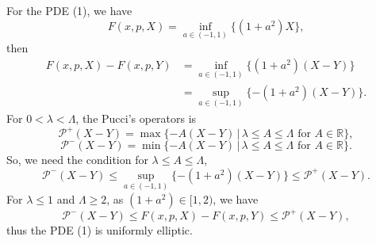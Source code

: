 \documentclass[12pt,a4paper]{ctexart}
\begin{document}
For the PDE (1), we have
\begin{equation*}
    F(x, p, X) = \inf_{a \in (-1, 1)} \{(1+a^2) X\}, 
\end{equation*}
then
\begin{align*}
    F(x, p, X) - F(x, p, Y) & = \inf_{a \in (-1, 1)} \{ (1 + a^2) (X - Y) \} \\
    & = \sup_{a \in (-1, 1)} \{-(1 + a^2) (X - Y)\}.
\end{align*}
For $0 < \lambda < \Lambda$, the Pucci's operators is 
\begin{equation*}
    \mathcal{P}^{+}(X - Y) = \max \{- A(X- Y) \,| \, \lambda \leq A \leq \Lambda \,\, \text{for} \,\, A \in \mathbb{R}\},
\end{equation*}
\begin{equation*}
    \mathcal{P}^{-}(X - Y) = \min \{- A(X - Y) \,| \, \lambda \leq A \leq \Lambda \,\, \text{for} \,\, A \in \mathbb{R}\}.
\end{equation*}
So, we need the condition for $\lambda \leq A \leq \Lambda$,
\begin{equation*}
    \mathcal{P}^{-}(X - Y) \leq \sup_{a \in (-1,1)} \{-(1 + a^2)(X - Y)\} \leq \mathcal{P}^{+}(X - Y).
\end{equation*}
For $\lambda \leq 1$ and $\Lambda \geq 2$, as $(1 + a^2) \in [1, 2)$, we have
\begin{equation*}
    \mathcal{P}^{-} (X - Y) \leq F(x, p, X) - F(x, p, Y) \leq \mathcal{P}^{+} (X - Y),
\end{equation*}
thus the PDE (1) is uniformly elliptic. 
\end{document}
